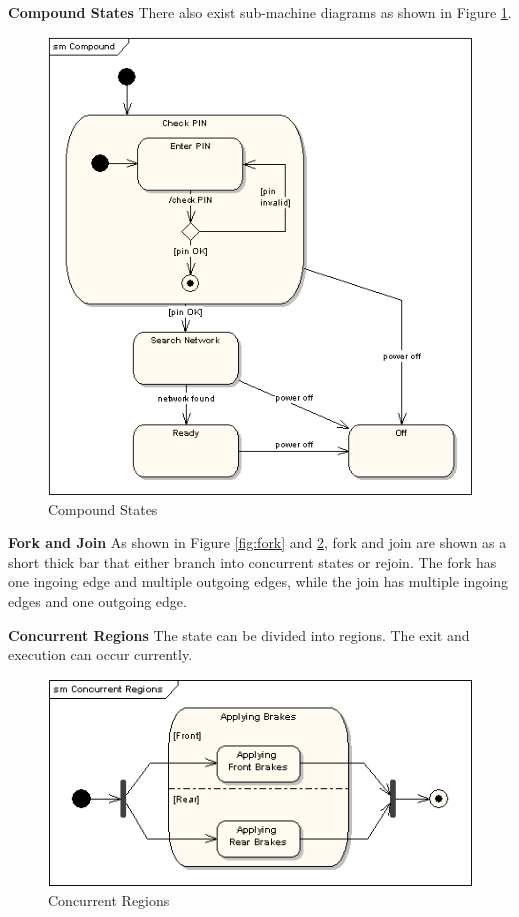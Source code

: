 \textbf{Compound States}
There also exist sub-machine diagrams as shown in Figure
\ref{fig:compoundStates}.
\begin{figure}[ht]
    \centering
    \includegraphics[scale=0.4]{Bilder/sm7.png}
    \caption{Compound States\cite{state_machine_diagram}}
    \label{fig:compoundStates}
\end{figure}

\textbf{Fork and Join}
As shown in Figure \ref{fig:fork} and \ref{fig:region}, fork and join are shown as a short thick bar that either branch into concurrent states or rejoin. 
The fork has one ingoing edge and multiple outgoing edges, while the join has multiple ingoing edges and one outgoing edge.

\textbf{Concurrent Regions}
The state can be divided into regions. The exit and execution can occur currently.
\begin{figure}[ht]
    \centering
    \includegraphics[scale=0.55]{Bilder/sm8.png}
    \caption{Concurrent Regions\cite{state_machine_diagram}}
    \label{fig:region}
\end{figure}

